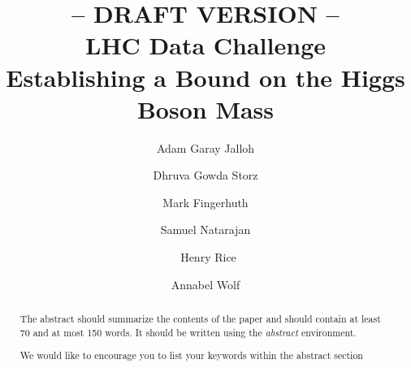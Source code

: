 \documentclass[runningheads,a4paper]{llncs}
\newcommand{\keywords}[1]{\par\addvspace\baselineskip
\noindent\keywordname\enspace\ignorespaces#1}
\begin{document}
\mainmatter  %

\title{-- DRAFT VERSION --\\LHC Data Challenge\\Establishing a Bound on the Higgs Boson Mass}


%
%
\author{Adam Garay Jalloh%
\and Dhruva Gowda Storz\and Mark Fingerhuth\and Samuel Natarajan\and\ Henry Rice\and Annabel Wolf}
%


%
%

\maketitle


\begin{abstract}
The abstract should summarize the contents of the paper and should
contain at least 70 and at most 150 words. It should be written using the
\emph{abstract} environment.
\keywords{We would like to encourage you to list your keywords within
the abstract section}
\end{abstract}
\end{document}
